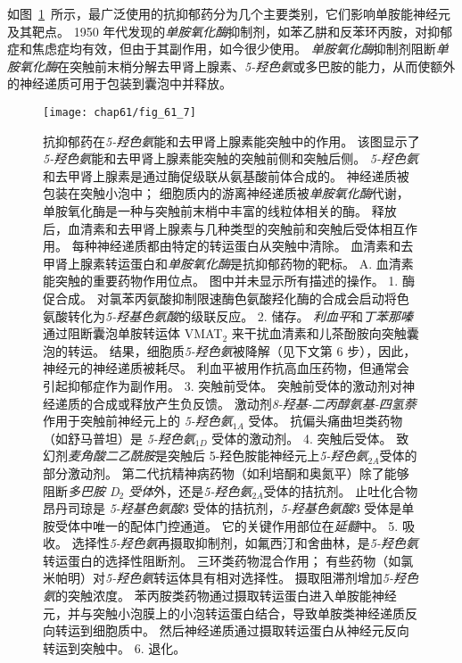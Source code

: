 如图~\ref{fig:61_7}~所示，最广泛使用的抗抑郁药分为几个主要类别，它们影响单胺能神经元及其靶点。
1950 年代发现的\textit{单胺氧化酶}抑制剂，如苯乙肼和反苯环丙胺，对抑郁症和焦虑症均有效，但由于其副作用，如今很少使用。
\textit{单胺氧化酶}抑制剂阻断\textit{单胺氧化酶}在突触前末梢分解去甲肾上腺素、\textit{5-羟色氨}或多巴胺的能力，从而使额外的神经递质可用于包装到囊泡中并释放。


\begin{figure}[htbp] \label{fig:61_7}
	\centering
	\texttt{[image: chap61/fig\_61\_7]}
	\caption{抗抑郁药在\textit{5-羟色氨}能和去甲肾上腺素能突触中的作用。
	该图显示了\textit{5-羟色氨}能和去甲肾上腺素能突触的突触前侧和突触后侧。
	\textit{5-羟色氨}和去甲肾上腺素是通过酶促级联从氨基酸前体合成的。
	神经递质被包装在突触小泡中；
	细胞质内的游离神经递质被\textit{单胺氧化酶}代谢，单胺氧化酶是一种与突触前末梢中丰富的线粒体相关的酶。
	释放后，血清素和去甲肾上腺素与几种类型的突触前和突触后受体相互作用。
	每种神经递质都由特定的转运蛋白从突触中清除。
	血清素和去甲肾上腺素转运蛋白和\textit{单胺氧化酶}是抗抑郁药物的靶标。
	A. 血清素能突触的重要药物作用位点。
	图中并未显示所有描述的操作。
	1. 酶促合成。
	对氯苯丙氨酸抑制限速酶色氨酸羟化酶的合成会启动将色氨酸转化为\textit{5-羟基色氨酸}的级联反应。
	2. 储存。
	\textit{利血平}和\textit{丁苯那嗪}通过阻断囊泡单胺转运体 VMAT$_2$ 来干扰血清素和儿茶酚胺向突触囊泡的转运。
	结果，细胞质\textit{5-羟色氨}被降解（见下文第 6 步），因此，神经元的神经递质被耗尽。
	利血平被用作抗高血压药物，但通常会引起抑郁症作为副作用。
	3. 突触前受体。
	突触前受体的激动剂对神经递质的合成或释放产生负反馈。
	激动剂\textit{8-羟基-二丙醇氨基-四氢萘}作用于突触前神经元上的 \textit{5-羟色氨}$_{1A}$ 受体。
	抗偏头痛曲坦类药物（如舒马普坦）是 \textit{5-羟色氨}$_{1D}$ 受体的激动剂。
	4. 突触后受体。
	致幻剂\textit{麦角酸二乙酰胺}是突触后 5-羟色胺能神经元上\textit{5-羟色氨}$_{2A}$受体的部分激动剂。
	第二代抗精神病药物（如利培酮和奥氮平）除了能够阻断\textit{多巴胺 D$_2$ 受体}外，还是\textit{5-羟色氨}$_{2A}$受体的拮抗剂。
	止吐化合物昂丹司琼是 \textit{5-羟基色氨酸}3 受体的拮抗剂，\textit{5-羟基色氨酸}3 受体是单胺受体中唯一的配体门控通道。
	它的关键作用部位在\textit{延髓}中。
	5. 吸收。
	选择性\textit{5-羟色氨}再摄取抑制剂，如氟西汀和舍曲林，是\textit{5-羟色氨}转运蛋白的选择性阻断剂。
	三环类药物混合作用；
	有些药物（如氯米帕明）对\textit{5-羟色氨}转运体具有相对选择性。
	摄取阻滞剂增加\textit{5-羟色氨}的突触浓度。
	苯丙胺类药物通过摄取转运蛋白进入单胺能神经元，并与突触小泡膜上的小泡转运蛋白结合，导致单胺类神经递质反向转运到细胞质中。
	然后神经递质通过摄取转运蛋白从神经元反向转运到突触中。
	6. 退化。
}
\end{figure}

